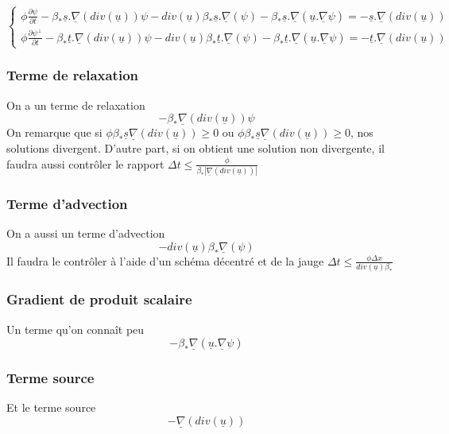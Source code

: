 \documentclass[a4paper,10pt]{article}
\begin{document}
  \begin{equation}
    \left\{\begin{array}{l}
      \phi\frac{\partial \psi}{\partial t}-\beta_*\underline{s}.\underline{\nabla}(div(\underline{u}))\psi-div(\underline{u})\beta_*\underline{s}.\underline\nabla(\psi)-\beta_*\underline{s}.\underline{\nabla}(\underline{u}.\underline{\nabla}\psi)=-\underline{s}.\underline{\nabla}(div(\underline{u}))\\
      \phi\frac{\partial \psi^\perp}{\partial t}-\beta_*\underline{t}.\underline{\nabla}(div(\underline{u}))\psi-div(\underline{u})\beta_*\underline{t}.\underline\nabla(\psi)-\beta_*\underline{t}.\underline{\nabla}(\underline{u}.\underline{\nabla}\psi)=-\underline{t}.\underline{\nabla}(div(\underline{u}))
    \end{array}\right.
  \end{equation}
  
  \subsubsection{Terme de relaxation}
  On a un terme de relaxation
  \[-\beta_*\underline{\nabla}(div(\underline{u}))\psi\]
  On remarque que si $\phi\beta_*\underline s\underline{\nabla}(div(\underline{u}))\geq0$ ou
  $\phi\beta_*\underline s\underline{\nabla}(div(\underline{u}))\geq0$, nos solutions divergent. D'autre part, si on obtient
  une solution non divergente, il faudra aussi contrôler le rapport
  $\Delta t\leq\frac\phi{\beta_*|\underline\nabla(div(\underline u))|}$							
  \subsubsection{Terme d'advection}
  On a aussi un terme d'advection
  \[-div(\underline{u})\beta_*\underline\nabla(\psi)\]
  Il faudra le contrôler à l'aide d'un schéma décentré et de la jauge $\Delta t\leq \frac{\phi\Delta x}{div(\underline u) \beta_*}$
  \subsubsection{Gradient de produit scalaire}
  Un terme qu'on connaît peu
  \[-\beta_*\underline{\nabla}(\underline{u}.\underline{\nabla}\psi)\]
  \subsubsection{Terme source}
  Et le terme source
  \[-\underline{\nabla}(div(\underline{u}))\]
\end{document}
